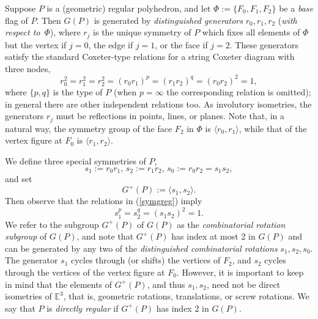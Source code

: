 \documentclass[12pt]{article}
\theoremstyle{definition}\newtheorem{definition}{Definition}[section]
\begin{document}
Suppose $P$ is a (geometric) regular polyhedron, and let $\Phi := \{F_{0},F_{1},F_{2}\}$ be a {\em base\/} flag of $P$. Then $G(P)$ is generated by {\em distinguished generators\/} $r_{0},r_{1},r_{2}$ ({\em with respect to\/}~$\Phi$), where $r_{j}$ is the unique symmetry of $P$ which fixes all elements of $\Phi$ but the vertex if $j=0$, the edge if $j=1$, or the face if $j=2$. These generators satisfy the standard Coxeter-type relations for a string Coxeter diagram with three nodes,
\begin{equation} 
\label{symgreg}
r_{0}^2 = r_{1}^2 = r_{2}^2 = 
(r_{0}r_{1})^{p} = (r_{1}r_{2})^{q} =
(r_{0}r_{2})^{2} = 1,
\end{equation}
where $\{p,q\}$ is the type of $P$ (when $p=\infty$ the corresponding relation is omitted); in general there are other independent relations too. As involutory isometries, the generators $r_j$ must be reflections in points, lines, or planes. Note that, in a natural way, the symmetry group of the face $F_2$ in $\Phi$ is $\langle r_{0},r_{1}\rangle$, while that of the vertex figure  at $F_0$ is $\langle r_1,r_2\rangle$. 
\smallskip

We define three special symmetries of $P$, 
\[s_1:=r_{0}r_{1},\, s_2:= r_{1}r_2,\, s_0:= r_{0}r_2 =s_{1}s_{2},\] 
and set
\[G^{+}(P):=\langle s_1,s_2 \rangle.\]
Then observe that the relations in (\ref{symgreg}) imply 
$$s_1^p = s_2^q = (s_1 s_2)^2 = 1.$$ 
We refer to the subgroup $G^{+}(P)$ of $G(P)$ as the \textit{combinatorial rotation subgroup} of $G(P)$, and note that $G^{+}(P)$ has index at most 2 in $G(P)$ and can be generated by any two of the \textit{distinguished combinatorial rotations} $s_1,s_2,s_0$. The generator $s_1$ cycles through (or shifts) the vertices of $F_2$, and $s_2$ cycles through the vertices of the vertex figure at $F_0$. However, it is important to keep in mind that the elements of $G^+(P)$, and thus $s_1,s_2$, need not be direct isometries of $\mathbb{E}^3$, that is, geometric rotations, translations, or screw rotations. We say that $P$ is {\it directly regular\/} if $G^+(P)$ has index 2 in $G(P)$. 
\end{document}
